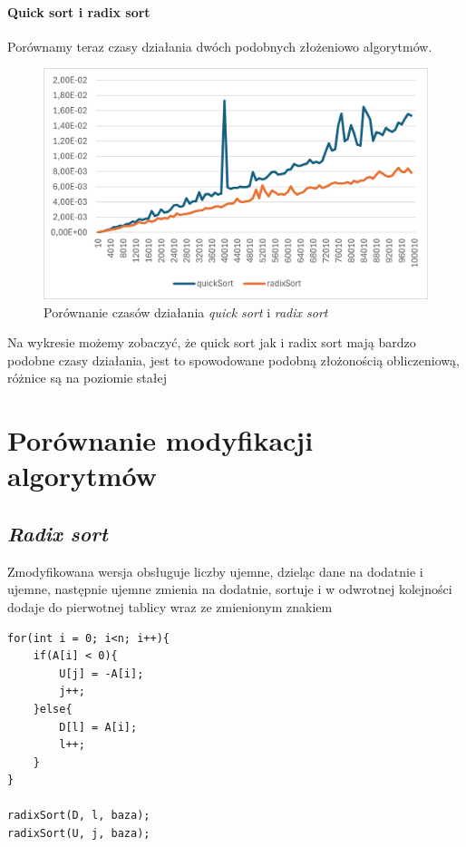 \documentclass{article}
\begin{document}
	\paragraph{Quick sort i radix sort}
	Porównamy teraz czasy działania dwóch podobnych złożeniowo algorytmów.
	\begin{figure}[H]
		\centering
		\includegraphics[width=\textwidth]{quickradix.png}
		\caption{Porównanie czasów działania \textit{quick sort} i \textit{radix sort}}
	\end{figure}
	Na wykresie możemy zobaczyć, że quick sort jak i radix sort mają bardzo podobne czasy działania, jest to spowodowane podobną złożonością obliczeniową, różnice są na poziomie stałej
	
	
	\section{Porównanie modyfikacji algorytmów}
	
	\subsection{\textit{Radix sort}}
	Zmodyfikowana wersja obsługuje liczby ujemne, dzieląc dane na dodatnie i ujemne, następnie ujemne zmienia na dodatnie, sortuje i w odwrotnej kolejności dodaje do pierwotnej tablicy wraz ze zmienionym znakiem
	\begin{lstlisting}
for(int i = 0; i<n; i++){ 
	if(A[i] < 0){
		U[j] = -A[i];
		j++;
	}else{
		D[l] = A[i];
		l++;
	} 
}

radixSort(D, l, baza);
radixSort(U, j, baza);
	\end{lstlisting}
	
\end{document}
